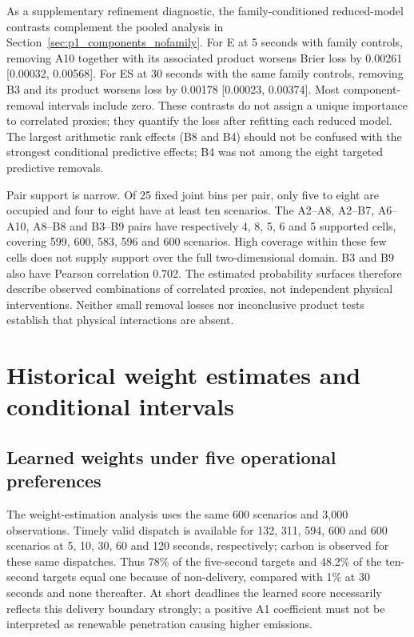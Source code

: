As a supplementary refinement diagnostic, the family-conditioned reduced-model
contrasts complement the pooled analysis in
Section~\ref{sec:p1_components_nofamily}. For E at 5 seconds with family controls, removing A10 together with its
associated product worsens Brier loss by 0.00261 [0.00032, 0.00568].
For ES at 30 seconds with the same family controls, removing B3 and its
product worsens loss by
0.00178 [0.00023, 0.00374]. Most component-removal intervals include
zero. These contrasts do not assign a unique importance to correlated
proxies; they quantify the loss after refitting each reduced model.
The largest arithmetic rank effects (B8 and B4) should not be confused
with the strongest conditional predictive effects; B4 was not among the
eight targeted predictive removals.

Pair support is narrow. Of 25 fixed joint bins per pair, only five to
eight are occupied and four to eight have at least ten scenarios.
The A2--A8, A2--B7, A6--A10, A8--B8 and B3--B9 pairs have respectively
4, 8, 5, 6 and 5 supported cells, covering 599, 600, 583, 596 and 600
scenarios. High coverage within these few cells does not supply support
over the full two-dimensional domain. B3 and B9 also have Pearson
correlation 0.702. The estimated probability surfaces therefore describe
observed combinations of correlated proxies, not independent physical
interventions. Neither small removal losses nor inconclusive product
tests establish that physical interactions are absent.


\section{Historical weight estimates and conditional intervals}
\subsection{Learned weights under five operational preferences}
\label{sec:p1_weight_results}
The weight-estimation analysis uses the same 600 scenarios and 3,000
observations. Timely
valid dispatch is available for 132, 311, 594, 600 and 600 scenarios at
5, 10, 30, 60 and 120 seconds, respectively; carbon is observed for these
same dispatches. Thus 78\% of the five-second targets and 48.2\% of the
ten-second targets equal one because of non-delivery, compared with 1\%
at 30 seconds and none thereafter. At short deadlines the learned score
necessarily reflects this delivery boundary strongly; a positive A1
coefficient must not be interpreted as renewable penetration causing
higher emissions.

